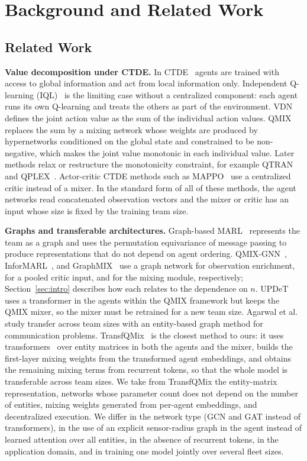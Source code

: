 \section{Background and Related Work}
\label{sec:background}

\subsection{Related Work}
\label{subsec:related}
\textbf{Value decomposition under CTDE.} In CTDE~\cite{kraemer2016,foerster2018coma} agents
are trained with access to global information and act from local information only.
Independent Q-learning (IQL)~\cite{iql} is the limiting case without a centralized
component: each agent runs its own Q-learning and treats the others as part of the
environment. VDN~\cite{vdn} defines the joint action value as the sum of the individual
action values. QMIX~\cite{qmix} replaces the sum by a mixing network whose weights are
produced by hypernetworks conditioned on the global state and constrained to be
non-negative, which makes the joint value monotonic in each individual value. Later methods
relax or restructure the monotonicity constraint, for example QTRAN~\cite{qtran} and
QPLEX~\cite{qplex}. Actor-critic CTDE methods such as MAPPO~\cite{mappo} use a centralized
critic instead of a mixer. In the standard form of all of these methods, the agent networks
read concatenated observation vectors and the mixer or critic has an input whose size is
fixed by the training team size.

\textbf{Graphs and transferable architectures.} Graph-based MARL~\cite{gnn_marl} represents
the team as a graph and uses the permutation equivariance of message passing to produce
representations that do not depend on agent ordering. QMIX-GNN~\cite{qmix-gnn},
InforMARL~\cite{nayak2023scalable}, and
GraphMIX~\cite{naderializadeh2021graphconvolutionalvaluedecomposition} use a graph network
for observation enrichment, for a pooled critic input, and for the mixing module,
respectively; Section~\ref{sec:intro} describes how each relates to the dependence on $n$.
UPDeT~\cite{updet} uses a transformer in the agents within the QMIX framework but keeps the
QMIX mixer, so the mixer must be retrained for a new team size. Agarwal et
al.~\cite{agarwal2020} study transfer across team sizes with an entity-based graph method
for communication problems. TransfQMix~\cite{transfqmix} is the closest method to ours: it
uses transformers~\cite{vaswani2017} over entity matrices in both the agents and the mixer,
builds the first-layer mixing weights from the transformed agent embeddings, and obtains
the remaining mixing terms from recurrent tokens, so that the whole model is transferable
across team sizes. We take from TransfQMix the entity-matrix representation, networks whose
parameter count does not depend on the number of entities, mixing weights generated from
per-agent embeddings, and decentralized execution. We differ in the network type (GCN and
GAT instead of transformers), in the use of an explicit sensor-radius graph in the agent
instead of learned attention over all entities, in the absence of recurrent tokens, in the
application domain, and in training one model jointly over several fleet sizes.


